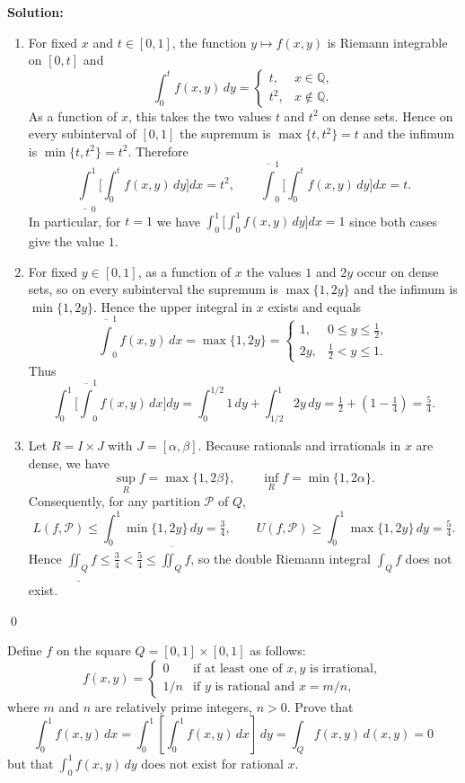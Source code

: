 \bigskip\noindent\textbf{Solution:}
\begin{enumerate}[label=(\alph*)]
\item For fixed $x$ and $t\in[0,1]$, the function $y\mapsto f(x,y)$ is Riemann integrable on $[0,t]$ and
\[\int_0^t f(x,y)\,dy = \begin{cases} t, & x\in\mathbb Q, \\[4pt] t^2, & x\notin\mathbb Q.\end{cases}\]
As a function of $x$, this takes the two values $t$ and $t^2$ on dense sets. Hence on every subinterval of $[0,1]$ the supremum is $\max\{t,t^2\}=t$ and the infimum is $\min\{t,t^2\}=t^2$. Therefore
\[ \underline\int_0^1\!\Big[\int_0^t f(x,y)\,dy\Big]dx = t^2,\qquad \overline\int_0^1\!\Big[\int_0^t f(x,y)\,dy\Big]dx = t. \]
In particular, for $t=1$ we have $\int_0^1\!\big[\int_0^1 f(x,y)\,dy\big]dx=1$ since both cases give the value $1$.

\item For fixed $y\in[0,1]$, as a function of $x$ the values $1$ and $2y$ occur on dense sets, so on every subinterval the supremum is $\max\{1,2y\}$ and the infimum is $\min\{1,2y\}$. Hence the upper integral in $x$ exists and equals
\[ \overline\int_0^1 f(x,y)\,dx = \max\{1,2y\} = \begin{cases} 1, & 0\le y\le \tfrac12, \\[4pt] 2y, & \tfrac12< y\le 1. \end{cases} \]
Thus
\[ \int_0^1\!\Big[\overline\int_0^1 f(x,y)\,dx\Big]dy = \int_0^{1/2}\!1\,dy + \int_{1/2}^1\!2y\,dy = \tfrac12 + (1-\tfrac14) = \tfrac{5}{4}. \]

\item Let $R=I\times J$ with $J=[\alpha,\beta]$. Because rationals and irrationals in $x$ are dense, we have
\[ \sup_R f = \max\{1,2\beta\},\qquad \inf_R f=\min\{1,2\alpha\}. \]
Consequently, for any partition $\mathcal P$ of $Q$,
\[ L(f,\mathcal P) \le \int_0^1 \min\{1,2y\}\,dy = \tfrac{3}{4},\qquad U(f,\mathcal P) \ge \int_0^1 \max\{1,2y\}\,dy = \tfrac{5}{4}. \]
Hence $\underline{\iint_Q} f \le \tfrac34 < \tfrac54 \le \overline{\iint_Q} f$, so the double Riemann integral $\int_Q f$ does not exist.
\end{enumerate}\qed


\begin{problembox}
Define \( f \) on the square \( Q = [0, 1] \times [0, 1] \) as follows:
\[f(x, y) = 
\begin{cases} 
0 & \text{if at least one of } x, y \text{ is irrational}, \\ 
1/n & \text{if } y \text{ is rational and } x = m/n,
\end{cases}\]
where \( m \) and \( n \) are relatively prime integers, \( n > 0 \). Prove that
\[\int_{0}^{1} f(x, y) \, dx = \int_{0}^{1} \left[ \int_{0}^{1} f(x, y) \, dx \right] \, dy = \int_{Q} f(x, y) \, d(x, y) = 0\]
but that \( \int_{0}^{1} f(x, y) \, dy \) does not exist for rational \( x \).
\end{problembox}

